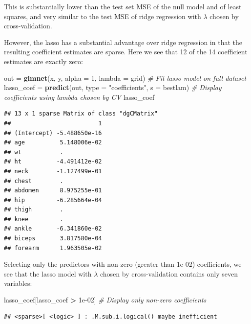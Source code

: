 \documentclass[]{article}
\newenvironment{Shaded}{\begin{snugshade}}{\end{snugshade}}
\newcommand{\KeywordTok}[1]{\textcolor[rgb]{0.13,0.29,0.53}{\textbf{#1}}}
\newcommand{\DataTypeTok}[1]{\textcolor[rgb]{0.13,0.29,0.53}{#1}}
\newcommand{\DecValTok}[1]{\textcolor[rgb]{0.00,0.00,0.81}{#1}}
\newcommand{\FloatTok}[1]{\textcolor[rgb]{0.00,0.00,0.81}{#1}}
\newcommand{\StringTok}[1]{\textcolor[rgb]{0.31,0.60,0.02}{#1}}
\newcommand{\CommentTok}[1]{\textcolor[rgb]{0.56,0.35,0.01}{\textit{#1}}}
\newcommand{\OperatorTok}[1]{\textcolor[rgb]{0.81,0.36,0.00}{\textbf{#1}}}
\newcommand{\NormalTok}[1]{#1}
\begin{document}
This is substantially lower than the test set MSE of the null model and
of least squares, and very similar to the test MSE of ridge regression
with \(\lambda\) chosen by cross-validation.

However, the lasso has a substantial advantage over ridge regression in
that the resulting coefficient estimates are sparse. Here we see that 12
of the 14 coefficient estimates are exactly zero:

\begin{Shaded}
\begin{Highlighting}[]
\NormalTok{out =}\StringTok{ }\KeywordTok{glmnet}\NormalTok{(x, y, }\DataTypeTok{alpha =} \DecValTok{1}\NormalTok{, }\DataTypeTok{lambda =}\NormalTok{ grid) }\CommentTok{# Fit lasso model on full dataset}
\NormalTok{lasso_coef =}\StringTok{ }\KeywordTok{predict}\NormalTok{(out, }\DataTypeTok{type =} \StringTok{"coefficients"}\NormalTok{, }
\DataTypeTok{s =}\NormalTok{ bestlam) }\CommentTok{# Display coefficients using lambda chosen by CV}
\NormalTok{lasso_coef}
\end{Highlighting}
\end{Shaded}

\begin{verbatim}
## 13 x 1 sparse Matrix of class "dgCMatrix"
##                         1
## (Intercept) -5.488650e-16
## age          5.148006e-02
## wt           .           
## ht          -4.491412e-02
## neck        -1.127499e-01
## chest        .           
## abdomen      8.975255e-01
## hip         -6.285664e-04
## thigh        .           
## knee         .           
## ankle       -6.341860e-02
## biceps       3.817580e-04
## forearm      1.963505e-02
\end{verbatim}

Selecting only the predictors with non-zero (greater than 1e-02)
coefficients, we see that the lasso model with \(\lambda\) chosen by
cross-validation contains only seven variables:

\begin{Shaded}
\begin{Highlighting}[]
\NormalTok{lasso_coef[lasso_coef }\OperatorTok{>}\StringTok{ }\FloatTok{1e-02}\NormalTok{] }\CommentTok{# Display only non-zero coefficients}
\end{Highlighting}
\end{Shaded}

\begin{verbatim}
## <sparse>[ <logic> ] : .M.sub.i.logical() maybe inefficient
\end{verbatim}
\end{document}
